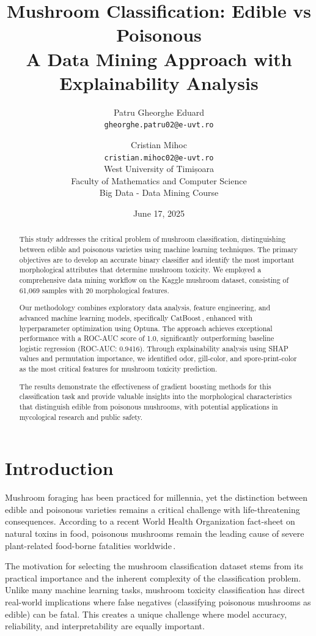 \documentclass[11pt,a4paper]{article}
\title{\textbf{Mushroom Classification: Edible vs Poisonous}\\
       \large{A Data Mining Approach with Explainability Analysis}}
\author{
    Patru Gheorghe Eduard\\
    \texttt{gheorghe.patru02@e-uvt.ro}
    \and
    Cristian Mihoc\\
    \texttt{cristian.mihoc02@e-uvt.ro}\\[0.5em]
    \small{West University of Timișoara}\\
    \small{Faculty of Mathematics and Computer Science}\\
    \small{Big Data - Data Mining Course}
}
\date{June 17, 2025}
\begin{document}
\maketitle

\tableofcontents
\newpage

\begin{abstract}
This study addresses the critical problem of mushroom classification, distinguishing between edible and poisonous varieties using machine learning techniques. The primary objectives are to develop an accurate binary classifier and identify the most important morphological attributes that determine mushroom toxicity. We employed a comprehensive data mining workflow on the Kaggle mushroom dataset, consisting of 61,069 samples with 20 morphological features.

Our methodology combines exploratory data analysis, feature engineering, and advanced machine learning models, specifically CatBoost\,\cite{prokhorenkova2018catboost}, enhanced with hyperparameter optimization using Optuna. The approach achieves exceptional performance with a ROC-AUC score of 1.0, significantly outperforming baseline logistic regression (ROC-AUC: 0.9416). Through explainability analysis using SHAP values and permutation importance, we identified odor, gill-color, and spore-print-color as the most critical features for mushroom toxicity prediction.

The results demonstrate the effectiveness of gradient boosting methods for this classification task and provide valuable insights into the morphological characteristics that distinguish edible from poisonous mushrooms, with potential applications in mycological research and public safety.
\end{abstract}

\section{Introduction}

Mushroom foraging has been practiced for millennia, yet the distinction between edible and poisonous varieties remains a critical challenge with life-threatening consequences. According to a recent World Health Organization fact-sheet on natural toxins in food,
poisonous mushrooms remain the leading cause of severe plant-related food-borne
fatalities worldwide\,\cite{who2023naturaltoxins}.

The motivation for selecting the mushroom classification dataset stems from its practical importance and the inherent complexity of the classification problem. Unlike many machine learning tasks, mushroom toxicity classification has direct real-world implications where false negatives (classifying poisonous mushrooms as edible) can be fatal. This creates a unique challenge where model accuracy, reliability, and interpretability are equally important.
\end{document}
